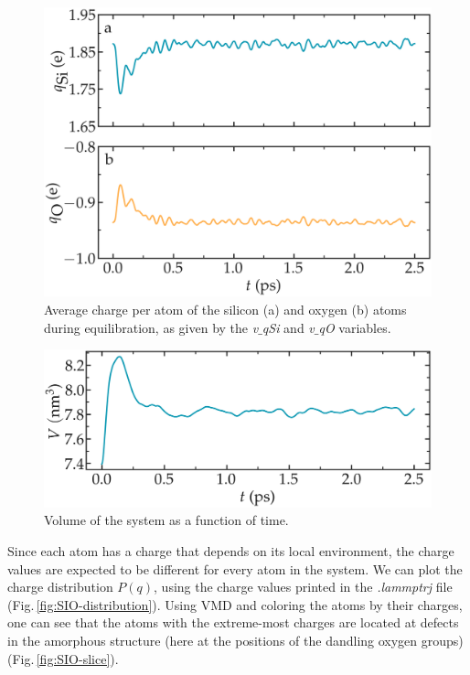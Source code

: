 \documentclass[9pt,tutorial]{livecoms}
\begin{document}
\begin{figure}
\centering
\includegraphics[width=\linewidth]{SIO-charge}
\caption{Average charge per atom of the silicon (a) and oxygen (b) atoms during equilibration, as given by the \textit{v$\_$qSi} and \textit{v$\_$qO} variables.}
\label{fig:SIO-charge}
\end{figure}

\begin{figure}
\includegraphics[width=\linewidth]{SIO-volume}
\caption{Volume of the system as a function of time.}
\label{fig:SIO-volume}
\end{figure}

Since each atom has a charge that depends on its local environment, the charge values are expected to be different for every atom in the system. We can plot the charge distribution $P(q)$, using the charge values printed in the \textit{.lammptrj} file (Fig.\,\ref{fig:SIO-distribution}). Using VMD and coloring the atoms by their charges, one can see that the atoms with the extreme-most charges are located at defects in the amorphous structure (here at the positions of the dandling oxygen groups) (Fig.\,\ref{fig:SIO-slice}).
\end{document}
